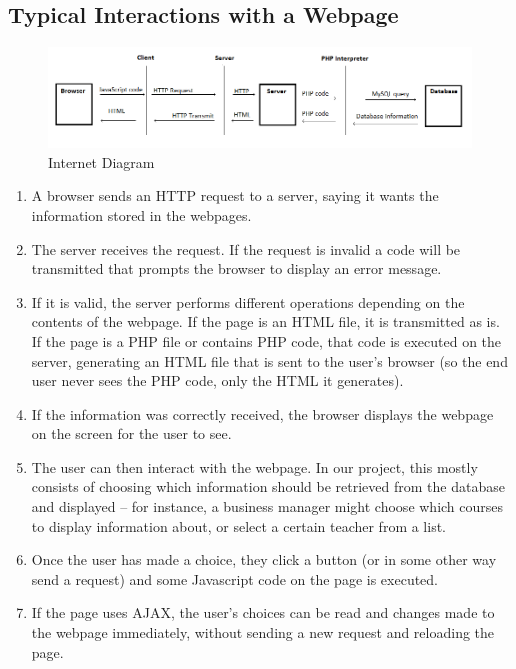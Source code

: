 	\subsection{Typical Interactions with a Webpage}
		\begin{figure}[H]
			\centering
			\includegraphics[scale=0.555]{Internet_Diagram.png}
			\caption{Internet Diagram}
		\end{figure}
		\begin{enumerate}
			\item A browser sends an HTTP request to a server, saying it wants the information stored in the webpages.
		
			\item 		The server receives the request. If the request is invalid a code will be transmitted that prompts the browser to display an error message.
		
			\item 		If it is valid, the server performs different operations depending on the contents of the webpage. If the page is an HTML file, it is transmitted as is. If the page is a PHP file or contains PHP code, that code is executed on the server, generating an HTML file that is sent to the user's browser (so the end user never sees the PHP code, only the HTML it generates).
		
			\item 		If the information was correctly received, the browser displays the webpage on the screen for the user to see.
		
			\item 		The user can then interact with the webpage. In our project, this mostly consists of choosing which information should be retrieved from the database and displayed – for instance, a business manager might choose which courses to display information about, or select a certain teacher from a list.

			\item 	Once the user has made a choice, they click a button (or in some other way send a request) and some Javascript code on the page is executed.
	
			\item If the page uses AJAX, the user's choices can be read and changes made to the webpage immediately, without sending a new request and reloading the page.


\end{enumerate}
